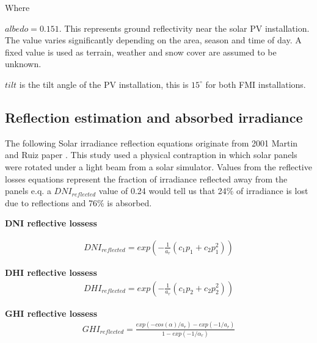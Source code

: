 \noindent Where 

$albedo = 0.151$. This represents ground reflectivity near the solar PV installation. The value varies significantly depending on the area, season and time of day. A fixed value is used as terrain, weather and snow cover are assumed to be unknown.

$tilt$ is the tilt angle of the PV installation, this is $15^\circ$ for both FMI installations.


\newpage
\subsection{Reflection estimation and absorbed irradiance}
The following Solar irradiance reflection equations originate from 2001 Martin and Ruiz paper \cite{solar_reflections}. This study used a physical contraption in which solar panels were rotated under a light beam from a solar simulator. Values from the reflective losses equations represent the fraction of irradiance reflected away from the panels e.q. a $DNI_{reflected}$ value of 0.24 would tell us that 24\% of irradiance is lost due to reflections and 76\% is absorbed. 

\noindent\textbf{DNI reflective lossess}

\begin{equation} 
\begin{split}
\label{solar_reflecive_dni_loss} 
DNI_{reflected}= exp(-\frac{1}{a_r}(c_1 p_1 +c_2 p_1^2))
\end{split}
\end{equation}


\noindent\textbf{DHI reflective lossess}
%
\begin{equation}
\begin{split}
\label{solar_reflecive_dhi_loss}
DHI_{reflected}= exp(-\frac{1}{a_r}(c_1 p_2 +c_2 p_2^2))
\end{split}
\end{equation}

\noindent\textbf{GHI reflective lossess}
%
\begin{equation}
\begin{split}
\label{solar_reflecive_ghi_loss}
GHI_{reflected} = \frac{exp(-cos(\alpha)/a_r)- exp(-1/a_r)}{1-exp(-1/\alpha_r)}
\end{split}
\end{equation}

